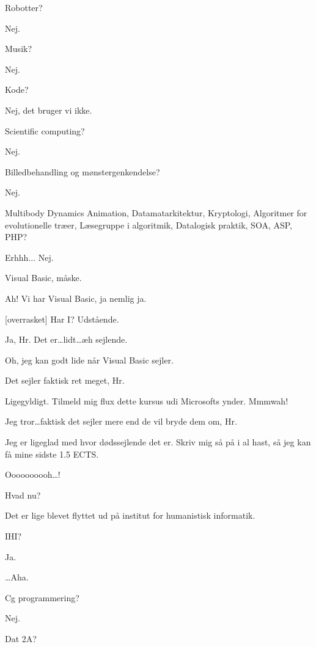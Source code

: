 \documentclass[a4paper,11pt]{article}
\begin{document}
\begin{sketch}
   Robotter?

   Nej.

   Musik?

   Nej.

   Kode?

   Nej, det bruger vi ikke.

   Scientific computing?

    Nej.

   Billedbehandling og mønstergenkendelse?

   Nej.

   Multibody Dynamics Animation, Datamatarkitektur, Kryptologi,
  Algoritmer for evolutionelle træer, Læsegruppe i algoritmik, Datalogisk
  praktik, SOA, ASP, PHP?

   Erhhh... Nej.

   Visual Basic, måske.

   Ah! Vi har Visual Basic, ja nemlig ja.

  [overrasket] Har I? Udstående.

   Ja, Hr. Det er\ldots lidt\ldots æh sejlende.

   Oh, jeg kan godt lide når Visual Basic sejler.

   Det sejler faktisk ret meget, Hr.

   Ligegyldigt. Tilmeld mig flux dette kursus udi Microsofts ynder.
  Mmmwah!

   Jeg tror\ldots faktisk det sejler mere end de vil bryde dem om, Hr.

   Jeg er ligeglad med hvor dødssejlende det er. Skriv mig så på i al
  hast, så jeg kan få mine sidste 1.5 ECTS.

   Oooooooooh\ldots!


   Hvad nu?

   Det er lige blevet flyttet ud på institut for humanistisk informatik.

   IHI?

   Ja.

   \ldots Aha.


   Cg programmering?

   Nej.

   Dat 2A?


\end{sketch}
\end{document}
